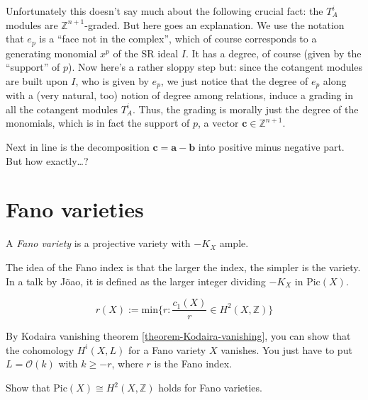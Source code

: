 \noindent
Unfortunately this doesn't say much about the
following crucial fact:
the $T^i_A$ modules are
$\mathbb{Z}^{n+1}$-graded.
But here goes an explanation.
We use the notation that $e_p$ is a ``face
not in the complex'',
which of course corresponds to a generating
monomial $x^p$
of the SR ideal $I$.
It has a degree, of course (given by the
``support'' of $p$).
Now here's a rather sloppy step but:
since the cotangent modules are built upon
$I$,
who is given by $e_p$,
we just notice that the degree of $e_p$
along with a (very natural, too) notion of
degree among relations,
induce a grading in all the cotangent modules
$T_A^i$.
Thus, the grading is morally just the degree
of the monomials,
which is in fact the support of $p$, a vector
$\mathbf{c} \in \mathbb{Z}^{n+1}$.

Next in line is the decomposition
$\mathbf{c}=\mathbf{a}-\mathbf{b}$
into positive minus negative part. But how
exactly…?








\section{Fano varieties}
\label{section-Fano-varieties}

\begin{definition}
\label{definition-Fano-variety}
A {\it Fano variety} is a projective variety
with $-K_X$ ample.
\end{definition}

\noindent
The idea of the Fano index is that the
larger the index, the simpler is the variety.
In a talk by Jõao, it is defined as the
larger integer
dividing $-K_X$ in $\text{Pic}(X)$.
\begin{definition}
\label{definition-Fano-index}
$$
r(X):=\text{min}\{r:\frac{c_1(X)}{r}\in
H^{2}(X,\mathbb{Z})\}
$$
\end{definition}

\begin{exercise}
\label{exercise-fano-vanis-highe-cohom}
By Kodaira vanishing theorem
\ref{theorem-Kodaira-vanishing},
you can show that the cohomology $H^{i}(X,L)$
for
a Fano variety $X$ vanishes. You just have to
put $L=\mathcal{O}(k)$ with $k\geq
-r$, where $r$ is the Fano index.
\end{exercise}

\begin{exercise}
\label{exercise-Pic-H2-Fano}
Show that  $\text{Pic}(X)\cong
H^{2}(X,\mathbb{Z})$ holds for Fano
varieties.
\end{exercise}

